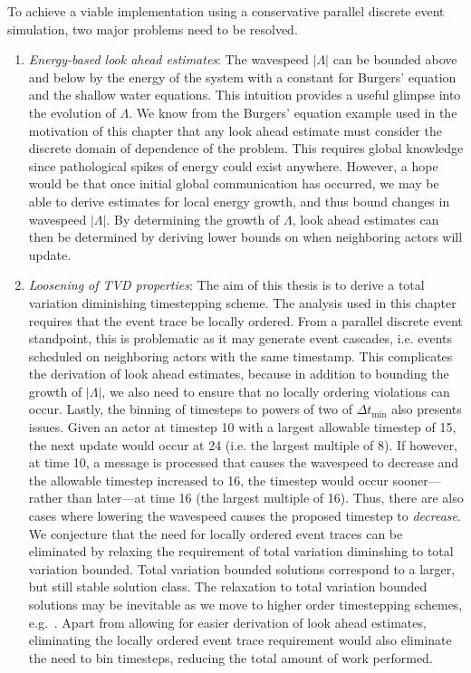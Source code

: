 \documentclass[10pt,letterpaper]{article}
\begin{document}
To achieve a viable implementation using a conservative parallel discrete event simulation, two major problems need to be resolved. 
\begin{enumerate}
\item {\em Energy-based look ahead estimates}: The wavespeed $|\Lambda|$ can be bounded above and below by the energy of the system with a constant for Burgers' equation and the shallow water equations. This intuition provides a useful glimpse into the evolution of $\Lambda$. We know from the Burgers' equation example used in the motivation of this chapter that any look ahead estimate must consider the discrete domain of dependence of the problem. This requires global knowledge since pathological spikes of energy could exist anywhere. 
However, a hope would be that once initial global communication has occurred, we may be able to derive estimates for local energy growth, and thus bound changes in wavespeed $|\Lambda|$. By determining the growth of $\Lambda$, look ahead estimates can then be determined by deriving lower bounds on when neighboring actors will update.

\item {\em Loosening of TVD properties}: The aim of this thesis is to derive a total variation diminishing timestepping scheme. The analysis used in this chapter requires that the event trace be locally ordered. From a parallel discrete event standpoint, this is problematic as it may generate event cascades, i.e. events scheduled on neighboring actors with the same timestamp. This complicates the derivation of look ahead estimates, because in addition to bounding the growth of $|\Lambda|$, we also need to ensure that no locally ordering violations can occur. Lastly, the binning of timesteps to powers of two of $\Delta t_{\min}$ also presents issues. Given an actor at timestep 10 with a largest allowable timestep of 15, the next update would occur at 24 (i.e. the largest multiple of 8). If however, at time 10, a message is processed that causes the wavespeed to decrease and the allowable timestep increased to 16, the timestep would occur sooner---rather than later---at time 16 (the largest multiple of 16). Thus, there are also cases where lowering the wavespeed causes the proposed timestep to {\em decrease}. We conjecture that the need for locally ordered event traces can be eliminated by relaxing the requirement of total variation diminshing to total variation bounded. Total variation bounded solutions correspond to a larger, but still stable solution class. The relaxation to total variation bounded solutions may be inevitable as we move to higher order timestepping schemes, e.g.~\cite{Constantinescu}. Apart from allowing for easier derivation of look ahead estimates, eliminating the locally ordered event trace requirement would also eliminate the need to bin timesteps, reducing the total amount of work  performed.
\end{enumerate}
\end{document}
